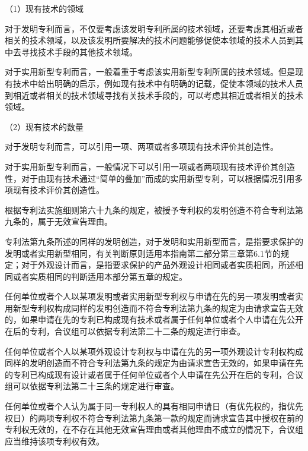{\setlength{\parindent}{17.1bp}（1）现有技术的领域\par}

对于发明专利而言，不仅要考虑该发明专利所属的技术领域，还要考虑其相近或者相关的技术领域，以及该发明所要解决的技术问题能够促使本领域的技术人员到其中去寻找技术手段的其他技术领域。

对于实用新型专利而言，一般着重于考虑该实用新型专利所属的技术领域。但是现有技术中给出明确的启示，例如现有技术中有明确的记载，促使本领域的技术人员到相近或者相关的技术领域寻找有关技术手段的，可以考虑其相近或者相关的技术领域。

{\setlength{\parindent}{17.1bp}（2）现有技术的数量\par}

对于发明专利而言，可以引用一项、两项或者多项现有技术评价其创造性。

对于实用新型专利而言，一般情况下可以引用一项或者两项现有技术评价其创造性，对于由现有技术通过“简单的叠加”而成的实用新型专利，可以根据情况引用多项现有技术评价其创造性。

根据专利法实施细则第六十九条的规定，被授予专利权的发明创造不符合专利法第九条的，属于无效宣告理由。

专利法第九条所述的同样的发明创造，对于发明和实用新型而言，是指要求保护的发明或者实用新型相同，有关判断原则适用本指南第二部分第三章第6.1节的规定；对于外观设计而言，是指要求保护的产品外观设计相同或者实质相同，所述相同或者实质相同的判断适用本部分第五章的规定。

任何单位或者个人以某项发明或者实用新型专利权与申请在先的另一项发明或者实用新型专利权构成同样的发明创造而不符合专利法第九条的规定为由请求宣告无效的，如果申请在先的专利已构成现有技术或者属于任何单位或者个人申请在先公开在后的专利，合议组可以依据专利法第二十二条的规定进行审查。

任何单位或者个人以某项外观设计专利权与申请在先的另一项外观设计专利权构成同样的发明创造而不符合专利法第九条的规定为由请求宣告无效的，如果申请在先的专利已构成现有设计或者属于任何单位或者个人申请在先公开在后的专利，合议组可以依据专利法第二十三条的规定进行审查。

任何单位或者个人认为属于同一专利权人的具有相同申请日（有优先权的，指优先权日）的两项专利权不符合专利法第九条第一款的规定而请求宣告其中授权在前的专利权无效的，在不存在其他无效宣告理由或者其他理由不成立的情况下，合议组应当维持该项专利权有效。

